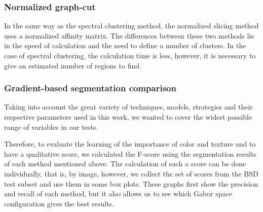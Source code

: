 
\subsubsection{Normalized graph-cut}
In the same way as the spectral clustering method, the normalized slicing method uses a normalized affinity matrix. The differences between these two methods lie in the speed of calculation and the need to define a number of clusters. In the case of spectral clustering, the calculation time is less, however, it is necessary to give an estimated number of regions to find.

\subsubsection{Gradient-based segmentation comparison}

Taking into account the great variety of techniques, models, strategies and their respective parameters used in this work, we wanted to cover the widest possible range of variables in our tests.

Therefore, to evaluate the learning of the importance of color and texture and to have a qualitative score, we calculated the F-score using the segmentation results of each method mentioned above. The calculation of such a score can be done individually, that is, by image, however, we collect the set of scores from the BSD test subset and use them in some box plots. These graphs first show the precision and recall of each method, but it also allows us to see which Gabor space configuration gives the best results.



